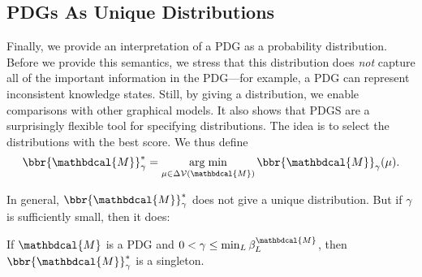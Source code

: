 \documentclass[letterpaper]{article} %
\theoremstyle{plain}
\theoremstyle{definition}
\theoremstyle{remark}
\DeclareMathOperator*{\argmin}{arg\;min}
\newcommand{\V}{\mathcal V}
\newcommand{\dg}[1]{\mathbdcal{#1}}
\newcommand{\begthm}[2]{\begin{#1}[restate=#2,label=#2]}
\begin{document}
    \subsection{PDGs As Unique Distributions}\label{sec:uniq-dist-semantics}

    Finally, we provide an interpretation of a PDG as a probability distribution.  
    Before we provide this semantics, we stress that
    this distribution does \emph{not} capture all of the important
    information in the PDG---for example, a PDG
    can represent inconsistent knowledge states. 
Still, by giving a distribution, we enable comparisons with other graphical models. 
It also 
 shows that PDGS are 
a surprisingly flexible tool for specifying distributions. 
The idea is to select the distributions with the best score.
We thus define 
\begin{equation}
\bbr{\dg M}_\gamma^* = \argmin_{\mu \in
				   \Delta\V(\dg M)} \bbr{\dg M}_\gamma(\mu).
\end{equation}   

In general, $\bbr{\dg M}_\gamma^*$ does not give a unique
distribution.  But if $\gamma$ is sufficiently small, then it does:
\begthm{prop}{prop:sem3}
If $\dg M$ is a PDG and $0 < \gamma \leq \min_L \beta_L^{\dg M}$, then $\bbr{\dg
M}_\gamma^*$ is a singleton. 
\end{prop}
\end{document}
